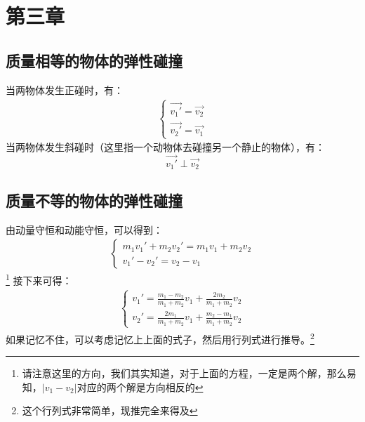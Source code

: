\documentclass{ctexart}
\begin{document}
\section{第三章}
\subsection{质量相等的物体的弹性碰撞}
当两物体发生正碰时，有：
\begin{align*}
    \begin{cases}
        \vec{v_1'} = \vec{v_2} \\
        \vec{v_2'} = \vec{v_1}
    \end{cases}
\end{align*}
当两物体发生斜碰时（这里指一个动物体去碰撞另一个静止的物体），有：
$$
    \vec{v_1'} \perp \vec{v_2}
$$
\subsection{质量不等的物体的弹性碰撞}
由动量守恒和动能守恒，可以得到：
\begin{align*}
    \begin{cases}
        m_1v_1' + m_2v_2' = m_1v_1 + m_2v_2 \\
        v_1' - v_2' = v_2 - v_1
    \end{cases}
\end{align*}
\footnote{请注意这里的方向，我们其实知道，对于上面的方程，一定是两个解，那么易知，$ |v_1 - v_2| $对应的两个解是方向相反的}
接下来可得：
\begin{align*}
    \begin{cases}
        v_1' = \frac{m_1 - m_2}{m_1 + m_2}v_1 + \frac{2m_2}{m_1 + m_2}v_2 \\
        v_2' = \frac{2m_1}{m_1 + m_2}v_1 + \frac{m_2 - m_1}{m_1 + m_2}v_2
    \end{cases}
\end{align*}
如果记忆不住，可以考虑记忆上上面的式子，然后用行列式进行推导。\footnote{这个行列式非常简单，现推完全来得及}
\end{document}
